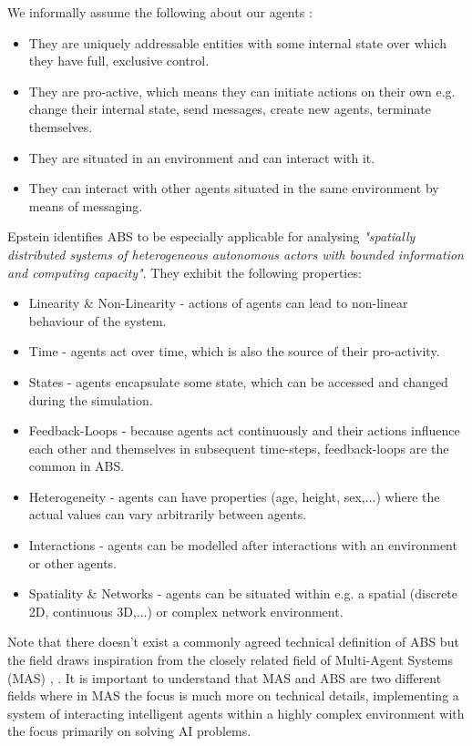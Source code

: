 We informally assume the following about our agents \cite{siebers_introduction_2008, wooldridge_introduction_2009, macal_everything_2016, odell_objects_2002}:

\begin{itemize}
	\item They are uniquely addressable entities with some internal state over which they have full, exclusive control.
	\item They are pro-active, which means they can initiate actions on their own e.g. change their internal state, send messages, create new agents, terminate themselves.
	\item They are situated in an environment and can interact with it.
	\item They can interact with other agents situated in the same environment by means of messaging.
\end{itemize} 

Epstein \cite{epstein_generative_2012} identifies ABS to be especially applicable for analysing \textit{"spatially distributed systems of heterogeneous autonomous actors with bounded information and computing capacity"}. They exhibit the following properties:

\begin{itemize}
	\item Linearity \& Non-Linearity - actions of agents can lead to non-linear behaviour of the system.
	\item Time - agents act over time, which is also the source of their pro-activity.
	\item States - agents encapsulate some state, which can be accessed and changed during the simulation.
	\item Feedback-Loops - because agents act continuously and their actions influence each other and themselves in subsequent time-steps, feedback-loops are the common in ABS. 
	\item Heterogeneity - agents can have properties (age, height, sex,...) where the actual values can vary arbitrarily between agents.
	\item Interactions - agents can be modelled after interactions with an environment or other agents.
	\item Spatiality \& Networks - agents can be situated within e.g. a spatial (discrete 2D, continuous 3D,...) or complex network environment.
\end{itemize}

Note that there doesn't exist a commonly agreed technical definition of ABS but the field draws inspiration from the closely related field of Multi-Agent Systems (MAS) \cite{wooldridge_introduction_2009}, \cite{weiss_multiagent_2013}. It is important to understand that MAS and ABS are two different fields where in MAS the focus is much more on technical details, implementing a system of interacting intelligent agents within a highly complex environment with the focus primarily on solving AI problems.

